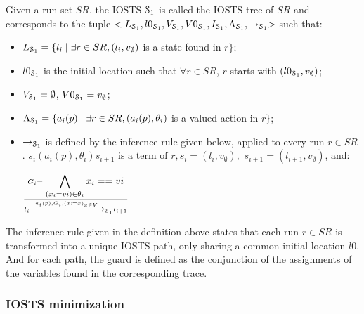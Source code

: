 \begin{definition}
\label{IOSTS_tree}
Given a run set $SR$, the IOSTS $\EuScript{S}_1$ is called the
IOSTS tree of $SR$ and corresponds to the tuple
$<L_{\EuScript{S}_1}, l0_{\EuScript{S}_1},V_{\EuScript{S}_1},
V0_{\EuScript{S}_1}, I_{\EuScript{S}_1},
\Lambda_{\EuScript{S}_1},\rightarrow_{\EuScript{S}_1}>$ such
that:

\begin{itemize}

\item $L_{\EuScript{S}_1}= \{l_i \mid \exists r\in SR, (l_i,v_\emptyset)$ is
a state found in $r\}$;

\item $l0_{\EuScript{S}_1}$ is the initial location such that $\forall r \in
SR$, $r$ starts with $(l0_{\EuScript{S}_1},v_\emptyset)$;

\item $V_{\EuScript{S}_1}=\emptyset$,
    $V0_{\EuScript{S}_1}=v_\emptyset$;

\item $\Lambda_{\EuScript{S}_1}= \{a_i(p) \mid \exists r\in SR,
(a_i(p),\theta_i)$ is a valued action in $r\}$;

\item $\rightarrow_{\EuScript{S}_1}$ is defined by the
    inference rule given below, applied to every run $r\in SR$.
    $s_i (a_i(p),\theta_i) s_{i+1} \text{ is a term of } r,
    s_i=(l_i,v_\emptyset),$ $s_{i+1}=(l_{i+1},v_\emptyset)$, and:

    \begin{center}
    {\Large
        $\frac{G_i=\displaystyle \bigwedge_{(x_i=vi)\in \theta_i} x_i==vi}
        {l_i \xrightarrow{a_i(p),G_i,(x:=x)_{x\in V}}_{\EuScript{S}_1} l_{i+1}}$
    }
    \end{center}

\end{itemize}
\end{definition}

The inference rule given in the definition above states that each
run $r \in SR$ is transformed into a unique IOSTS path, only
sharing a common initial location $l0$. And for each path, the
guard is defined as the conjunction of the assignments of the
variables found in the corresponding trace.

\subsubsection{IOSTS minimization}


